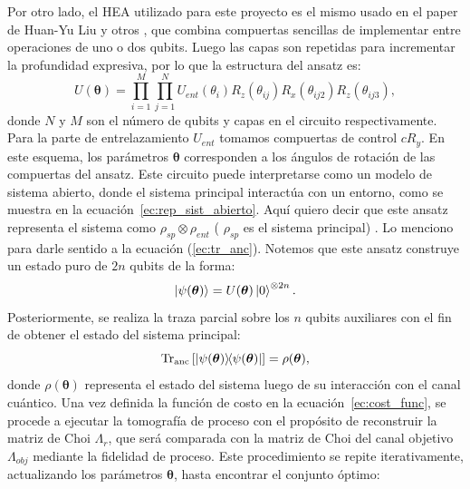 \documentclass[letterpaper,12pt]{thesisECFM}
\theoremstyle{plain}
\theoremstyle{definition}
\theoremstyle{definition}
\theoremstyle{remark}
\newcommand{\1}{\mathbb{1}}
\begin{document}
Por otro lado, el HEA utilizado para este proyecto es el mismo usado en el
paper de Huan-Yu Liu y otros \cite{Liu_2021} \cite{Sim_2019}, que combina
compuertas sencillas de implementar entre operaciones de uno o dos qubits.
Luego las capas son repetidas para incrementar la profundidad expresiva, por
lo que la estructura del ansatz es:
 \begin{equation}
 \label{ec:ansatz}
     U(\bm{\theta}) =\prod_{i=1}^{M} \prod_{j=1}^N U_{ent} (\theta_i)R_z(\theta_{ij})R_x(\theta_{ij2})R_z(\theta_{ij3}),
 \end{equation}
donde $N$ y $M$ son el número de qubits y capas en el circuito respectivamente.
Para la parte de entrelazamiento $U_{ent}$ tomamos compuertas de control
$cR_y$.  En este esquema, los parámetros $\bm{\theta}$ corresponden a los
ángulos de rotación de las compuertas del ansatz. Este circuito puede
interpretarse como un modelo de sistema abierto, donde el sistema principal
interactúa con un entorno, como se muestra en la
ecuación~\ref{ec:rep_sist_abierto}.
Aquí quiero decir que este ansatz representa el sistema como $\rho_{sp} \otimes
\rho_{ent}$ ( $\rho_{sp}$ es el sistema principal) . Lo menciono para darle
sentido a la ecuación  (\ref{ec:tr_anc}).  Notemos que este ansatz construye un
estado puro de  $2n$ qubits de la forma:
\begin{equation} 
    \ket{\psi(\bm{\theta})} = U(\bm{\theta})\ket{0}^{\otimes 2n}.
\end{equation}
Posteriormente, se realiza la traza parcial sobre los $n$ qubits auxiliares con el fin de obtener el estado del sistema principal:
\begin{equation} \label{ec:tr_anc}    \text{Tr}_{\text{anc}}\left[\ketbra{\psi(\bm{\theta})}{\psi(\bm{\theta})}\right] = \rho(\bm{\theta}),
\end{equation}
donde $\rho(\bm{\theta})$ representa el estado del sistema luego de su
interacción con el canal cuántico. Una vez definida la función de costo en la
ecuación~\ref{ec:cost_func}, se procede a ejecutar la tomografía de proceso
con el propósito de reconstruir la matriz de Choi
$\Lambda_{r}$, que será comparada con la matriz de Choi del canal objetivo
$\Lambda_{obj}$ mediante la fidelidad de proceso.
Este procedimiento se repite iterativamente, actualizando
los parámetros $\bm{\theta}$, hasta encontrar el conjunto óptimo:
\end{document}
